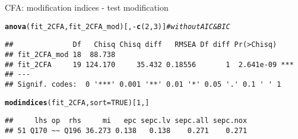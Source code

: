 \documentclass[10pt]{beamer}\usepackage[]{graphicx}\usepackage[]{xcolor}
\makeatletter
\newcommand{\hlnum}[1]{\textcolor[rgb]{0.686,0.059,0.569}{#1}}%
\newcommand{\hlcom}[1]{\textcolor[rgb]{0.678,0.584,0.686}{\textit{#1}}}%
\newcommand{\hlopt}[1]{\textcolor[rgb]{0,0,0}{#1}}%
\newcommand{\hldef}[1]{\textcolor[rgb]{0.345,0.345,0.345}{#1}}%
\newcommand{\hlkwc}[1]{\textcolor[rgb]{0.333,0.667,0.333}{#1}}%
\newcommand{\hlkwd}[1]{\textcolor[rgb]{0.737,0.353,0.396}{\textbf{#1}}}%
\newenvironment{kframe}{%
 \def\at@end@of@kframe{}%
 \ifinner\ifhmode%
  \def\at@end@of@kframe{\end{minipage}}%
  \begin{minipage}{\columnwidth}%
 \fi\fi%
 \def\FrameCommand##1{\hskip\@totalleftmargin \hskip-\fboxsep
 \colorbox{shadecolor}{##1}\hskip-\fboxsep
     \hskip-\linewidth \hskip-\@totalleftmargin \hskip\columnwidth}%
 \MakeFramed {\advance\hsize-\width
   \@totalleftmargin\z@ \linewidth\hsize
   \@setminipage}}%
 {\par\unskip\endMakeFramed%
 \at@end@of@kframe}
\newenvironment{knitrout}{}{} %
\makeatother
\begin{document}
%
\begin{frame}[fragile]{CFA: modification indices - test modification}

\begin{knitrout}
\color{fgcolor}\begin{kframe}
\begin{alltt}
\hlkwd{anova}\hldef{(fit_2CFA, fit_2CFA_mod)[,}\hlopt{-}\hlkwd{c}\hldef{(}\hlnum{2}\hldef{,}\hlnum{3}\hldef{)]} \hlcom{# without AIC & BIC}
\end{alltt}
\begin{verbatim}
##              Df   Chisq Chisq diff   RMSEA Df diff Pr(>Chisq)    
## fit_2CFA_mod 18  88.738                                          
## fit_2CFA     19 124.170     35.432 0.18556       1  2.641e-09 ***
## ---
## Signif. codes:  0 '***' 0.001 '**' 0.01 '*' 0.05 '.' 0.1 ' ' 1
\end{verbatim}
\end{kframe}
\end{knitrout}

\begin{knitrout}
\color{fgcolor}\begin{kframe}
\begin{alltt}
\hlkwd{modindices}\hldef{(fit_2CFA,} \hlkwc{sort} \hldef{=} \hlnum{TRUE}\hldef{)[}\hlnum{1}\hldef{,]}
\end{alltt}
\begin{verbatim}
##     lhs op  rhs     mi   epc sepc.lv sepc.all sepc.nox
## 51 Q170 ~~ Q196 36.273 0.138   0.138    0.271    0.271
\end{verbatim}
\end{kframe}
\end{knitrout}

\end{frame}
%
\end{document}
